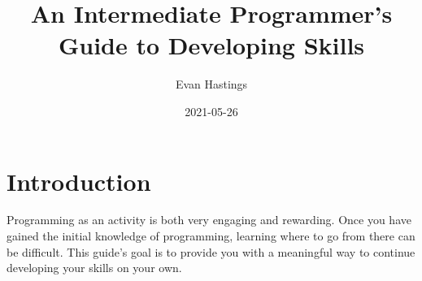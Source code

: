 \documentclass{article}
\title{An Intermediate Programmer's Guide to Developing Skills}
\date{2021-05-26}
\author{Evan Hastings}
\begin{document}
   \maketitle
   \newpage
   \tableofcontents
   \newpage
   \section{Introduction}
      Programming as an activity is both very engaging and rewarding.
      Once you have gained the initial knowledge of programming, learning where to go from there can be difficult.
      This guide's goal is to provide you with a meaningful way to continue developing your skills on your own.
\end{document}
